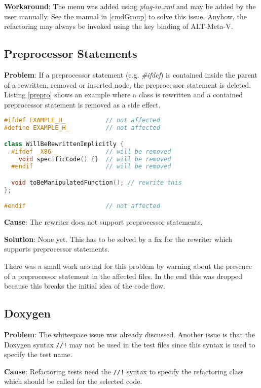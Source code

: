\textbf{Workaround}: The menu was added using \textit{plug-in.xml} and may be added 
by the user manually. See the manual in \ref{cmdGroup} to solve this issue. 
Anyhow, the refactoring may always be invoked using the key binding
of ALT-Meta-V.

\subsection{Preprocessor Statements}
\label{preprocessor}
\textbf{Problem}: If a preprocessor statement (e.g. \textit{\#ifdef}) is
contained inside the parent of a rewritten, removed or inserted node, the
preprocessor statement is deleted. Listing \ref{prepro} shows an example where a
class is rewritten and a contained preprocessor statement is removed as a side
effect.

\begin{lstlisting}[caption={Jeopardized preprocessor statement inside a class},
label={prepro}, language=C++]
#ifdef EXAMPLE_H_           // not affected
#define EXAMPLE_H_          // not affected

class WillBeRewrittenImplicitly {
  #ifdef _X86__             // will be removed
    void specificCode() {}  // will be removed
  #endif                    // will be removed

  void toBeManipulatedFunction(); // rewrite this
};

#endif                      // not affected
\end{lstlisting}

\textbf{Cause}: The rewriter does not support preprocessor statements.

\textbf{Solution}: None yet. This has to be solved by a fix for the rewriter
which supports preprocessor statements.

There was a small work around for this problem by warning about the presence of
a preprocessor statement in the affected files. In the end this was dropped
because this breaks the initial idea of the code flow.

\subsection{Doxygen}

\textbf{Problem}: The whitespace issue was already discussed. Another issue is
that the Doxygen \cite{Doxygen} syntax \texttt{//!} may not be used in the test
files since this syntax is used to specify the test name.

\textbf{Cause}: Refactoring tests need the \texttt{//!} syntax to specify the
refactoring class which should be called for the selected code.


